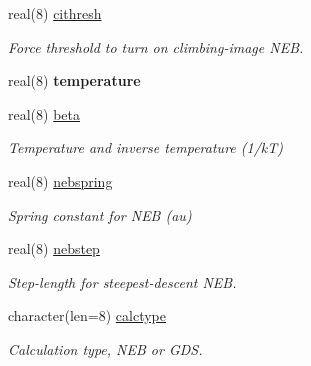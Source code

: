 \begin{DoxyCompactItemize}
real(8) \mbox{\hyperlink{namespaceglobaldata_a14c5976d38377f9a7cbef0e55faffa8a}{cithresh}}
\begin{DoxyCompactList}\small\item\em Force threshold to turn on climbing-\/image N\+EB. \end{DoxyCompactList}\item 
\mbox{\label{namespaceglobaldata_a0fa90542733148d5d6bab8981e884761}} 
real(8) {\bfseries temperature}
\item 
\mbox{\label{namespaceglobaldata_a842fd8b1656e10d5d750a5ce7357778c}} 
real(8) \mbox{\hyperlink{namespaceglobaldata_a842fd8b1656e10d5d750a5ce7357778c}{beta}}
\begin{DoxyCompactList}\small\item\em Temperature and inverse temperature (1/kT) \end{DoxyCompactList}\item 
\mbox{\label{namespaceglobaldata_a2fb01513c788abe123772c27c3b9669f}} 
real(8) \mbox{\hyperlink{namespaceglobaldata_a2fb01513c788abe123772c27c3b9669f}{nebspring}}
\begin{DoxyCompactList}\small\item\em Spring constant for N\+EB (au) \end{DoxyCompactList}\item 
\mbox{\label{namespaceglobaldata_a50e85a4766a32a20192c6760f09fbc1e}} 
real(8) \mbox{\hyperlink{namespaceglobaldata_a50e85a4766a32a20192c6760f09fbc1e}{nebstep}}
\begin{DoxyCompactList}\small\item\em Step-\/length for steepest-\/descent N\+EB. \end{DoxyCompactList}\item 
\mbox{\label{namespaceglobaldata_ae888214d68677339e6136f1115a54bda}} 
character(len=8) \mbox{\hyperlink{namespaceglobaldata_ae888214d68677339e6136f1115a54bda}{calctype}}
\begin{DoxyCompactList}\small\item\em Calculation type, N\+EB or G\+DS. \end{DoxyCompactList}\item 
\mbox{\label{namespaceglobaldata_a45ebfde17dc1300b187dd31f32218b83}} 

\end{DoxyCompactItemize}
